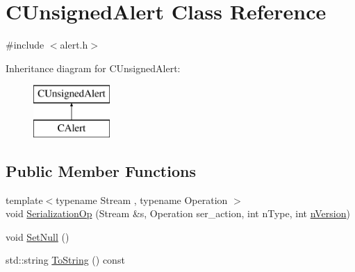 \hypertarget{class_c_unsigned_alert}{}\section{C\+Unsigned\+Alert Class Reference}
\label{class_c_unsigned_alert}


{\ttfamily \#include $<$alert.\+h$>$}

Inheritance diagram for C\+Unsigned\+Alert\+:\begin{figure}[H]
\begin{center}
\leavevmode
\includegraphics[height=2.000000cm]{class_c_unsigned_alert}
\end{center}
\end{figure}
\subsection*{Public Member Functions}
\begin{DoxyCompactItemize}
\item 
{\footnotesize template$<$typename Stream , typename Operation $>$ }\\void \mbox{\hyperlink{class_c_unsigned_alert_acdf81abb731f9fc8d2c04618f2f4d79d}{Serialization\+Op}} (Stream \&s, Operation ser\+\_\+action, int n\+Type, int \mbox{\hyperlink{class_c_unsigned_alert_ad8fad8e8f62caaf8162fad19170de2cf}{n\+Version}})
\item 
void \mbox{\hyperlink{class_c_unsigned_alert_a9d387307eb60095e50134d10eea3ad69}{Set\+Null}} ()
\item 
std\+::string \mbox{\hyperlink{class_c_unsigned_alert_a1ba948e1de4803565ec0dbec267eadb4}{To\+String}} () const
\end{DoxyCompactItemize}
